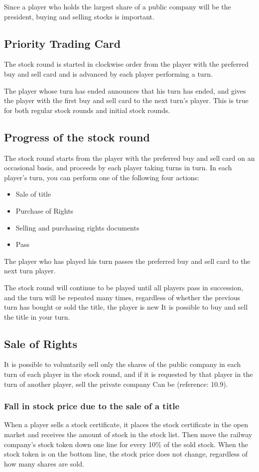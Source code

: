 \documentclass{article}
\begin{document}
\begin{CJK}{UTF8}{min}
Since a player who holds the largest share of a public company will be
the president, buying and selling stocks is important.

\subsection{Priority Trading Card}
The stock round is started in clockwise order from the player with the
preferred buy and sell card and is advanced by each player performing
a turn.

The player whose turn has ended announces that his turn has ended, and
gives the player with the first buy and sell card to the next turn's
player. This is true for both regular stock rounds and initial stock
rounds.

\subsection{Progress of the stock round}
The stock round starts from the player with the preferred buy and sell
card on an occasional basis, and proceeds by each player taking turns
in turn. In each player's turn, you can perform one of the following
four actions:
\begin{itemize}
\item Sale of title
\item Purchase of Rights
\item Selling and purchasing rights documents
\item Pass
\end{itemize}

The player who has played his turn passes the preferred buy and sell
card to the next turn player.

The stock round will continue to be played until all players pass in
succession, and the turn will be repeated many times, regardless of
whether the previous turn has bought or sold the title, the player is
new It is possible to buy and sell the title in your turn.

\subsection{Sale of Rights}
It is possible to voluntarily sell only the shares of the public
company in each turn of each player in the stock round, and if it is
requested by that player in the turn of another player, sell the
private company Can be (reference: 10.9).

\subsubsection{Fall in stock price due to the sale of a title}
When a player sells a stock certificate, it places the stock
certificate in the open market and receives the amount of stock in the
stock list. Then move the railway company's stock token down one line
for every 10\% of the sold stock. When the stock token is on the
bottom line, the stock price does not change, regardless of how many
shares are sold.


\end{CJK}
\end{document}
